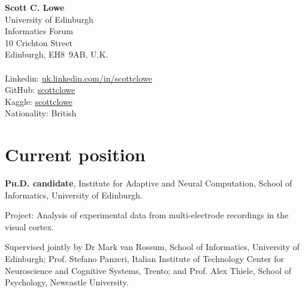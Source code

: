\documentclass[11pt, a4paper]{article} %
\newcommand{\withindent}{\setlength\parindent{15pt}}
\begin{document}
%
%
\textbf{\LARGE Scott C. Lowe}\\[1cm] %
%
University of Edinburgh\\
Informatics Forum\\
10 Crichton Street\\
Edinburgh, {EH8~9AB}, U.K.
%
\\[.2cm]
%
%
\\[.2cm]
%
Linkedin: \href{https://uk.linkedin.com/in/scottclowe}{uk.linkedin.com/in/scottclowe}\\
GitHub: \href{https://github.com/scottclowe}{scottclowe}\\
Kaggle: \href{https://www.kaggle.com/scottclowe}{scottclowe}\\
%
%

Nationality: British %
%
\\%


\section*{Current position}

\textbf{\textsc{Ph.D.} candidate}, Institute for Adaptive and Neural Computation, School of Informatics, University of Edinburgh.

{\withindent%
Project: Analysis of experimental data from multi-electrode recordings in the visual cortex.
}

{\withindent%
Supervised jointly by Dr Mark van Rossum, School of Informatics, University of Edinburgh; Prof. Stefano Panzeri, Italian Institute of Technology Center for Neuroscience and Cognitive Systems, Trento; and Prof. Alex Thiele, School of Psychology, Newcastle University.}
\end{document}
